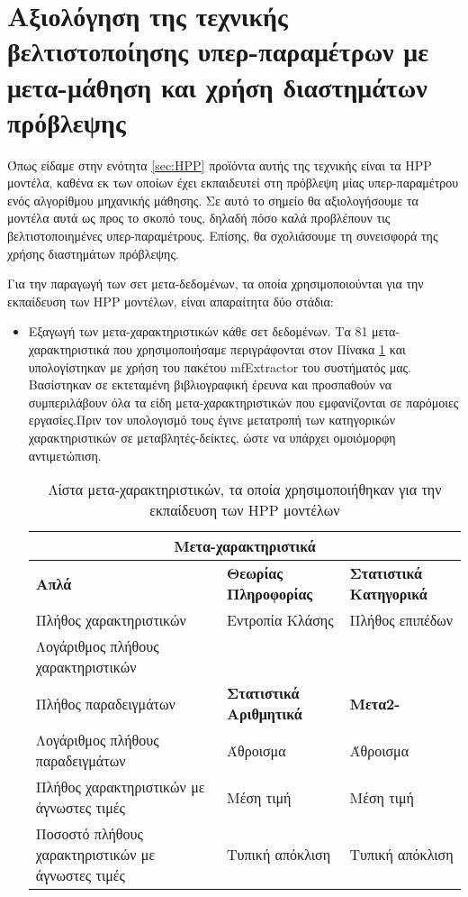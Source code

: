 \section{Αξιολόγηση της τεχνικής βελτιστοποίησης υπερ-παραμέτρων με μετα-μάθηση και χρήση διαστημάτων πρόβλεψης}
Όπως είδαμε στην ενότητα \ref{sec:HPP} προϊόντα αυτής της τεχνικής είναι τα \gls{HPP} μοντέλα, καθένα εκ των οποίων έχει εκπαιδευτεί στη πρόβλεψη μίας υπερ-παραμέτρου ενός αλγορίθμου μηχανικής μάθησης. Σε αυτό το σημείο θα αξιολογήσουμε τα μοντέλα αυτά ως προς το σκοπό τους, δηλαδή πόσο καλά προβλέπουν τις βελτιστοποιημένες υπερ-παραμέτρους. Επίσης, θα σχολιάσουμε τη συνεισφορά της χρήσης διαστημάτων πρόβλεψης.

Για την παραγωγή των σετ μετα-δεδομένων, τα οποία χρησιμοποιούνται για την εκπαίδευση των HPP μοντέλων, είναι απαραίτητα δύο στάδια:
\begin{itemize}
	\item Εξαγωγή των μετα-χαρακτηριστικών κάθε σετ δεδομένων. Τα  81 μετα-χαρακτηριστικά που χρησιμοποιήσαμε περιγράφονται στον Πίνακα \ref{table:meta} και υπολογίστηκαν με χρήση του πακέτου mf\-Extractor του συστήματός μας. Βασίστηκαν σε εκτεταμένη βιβλιογραφική έρευνα και προσπαθούν να συμπεριλάβουν όλα τα είδη μετα-χαρακτηριστικών που εμφανίζονται σε παρόμοιες εργασίες.Πριν τον υπολογισμό τους έγινε μετατροπή των κατηγορικών χαρακτηριστικών σε μεταβλητές-δείκτες, ώστε να υπάρχει ομοιόμορφη αντιμετώπιση.   
	 \begin{table}[!htb]
	 	\footnotesize
	 	\begin{center}
	 	\caption{Λίστα μετα-χαρακτηριστικών, τα οποία χρησιμοποιήθηκαν για την εκπαίδευση των HPP μοντέλων}
	 	\label{table:meta}
	 		\begin{tabular}{ |l l l | } 
	 			\hline
	 			\multicolumn{3}{|c|}{Μετα-χαρακτηριστικά}    \\
	 			\hline
	 			\textbf{Απλά} & \textbf{Θεωρίας Πληροφορίας} &   \textbf{Στατιστικά Kατηγορικά}  \\
	 			Πλήθος χαρακτηριστικών & Εντροπία Κλάσης  &   Πλήθος επιπέδων \\
	 			Λογάριθμος πλήθους χαρακτηριστικών &    & \\
	 			Πλήθος παραδειγμάτων &  \textbf{Στατιστικά Aριθμητικά} & \textbf{Μετα2-}   \\
	 			Λογάριθμος πλήθους παραδειγμάτων & Άθροισμα & Άθροισμα     \\
	 			Πλήθος χαρακτηριστικών με άγνωστες τιμές & Μέση τιμή & Μέση τιμή  \\
	 			Ποσοστό πλήθους χαρακτηριστικών με άγνωστες τιμές & Τυπική απόκλιση & Τυπική απόκλιση   \\

\end{tabular}
\end{center}
\end{table}
\end{itemize}
